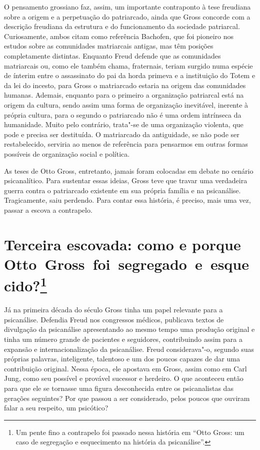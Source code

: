 O pensamento grossiano faz, assim, um importante contraponto à tese
freudiana sobre a origem e a perpetuação do patriarcado, ainda que Gross
concorde com a descrição freudiana da estrutura e do funcionamento da
sociedade patriarcal. Curiosamente, ambos citam como referência
Bachofen, que foi pioneiro nos estudos sobre as comunidades matriarcais
antigas, mas têm posições completamente distintas. Enquanto Freud
defende que as comunidades matriarcais ou, como ele também chama,
fraternais, teriam surgido numa espécie de ínterim entre o assassinato
do pai da horda primeva e a instituição do Totem e da lei do incesto,
para Gross o matriarcado estaria na origem das comunidades humanas.
Ademais, enquanto para o primeiro a organização patriarcal está na
origem da cultura, sendo assim uma forma de organização inevitável,
inerente à própria cultura, para o segundo o patriarcado não é uma ordem
intrínseca da humanidade. Muito pelo contrário, trata"-se de uma
organização violenta, que pode e precisa ser destituída. O matriarcado
da antiguidade, se não pode ser restabelecido, serviria ao menos de
referência para pensarmos em outras formas possíveis de organização
social e política.

As teses de Otto Gross, entretanto, jamais foram colocadas em debate no
cenário psicanalítico. Para sustentar essas ideias, Gross teve que
travar uma verdadeira guerra contra o patriarcado existente em sua
própria família e na psicanálise. Tragicamente, saiu perdendo. Para
contar essa história, é preciso, mais uma vez, passar a escova a
contrapelo.

\section{Terceira escovada: como e porque Otto~Gross~foi~segregado~e~esquecido?\protect\footnote{\uppercase{U}m pente fino a contrapelo foi passado nessa
  história em ``\uppercase{O}tto \uppercase{G}ross: um caso de segregação e esquecimento na
  história da psicanálise''.}}

Já na primeira década do século  Gross tinha um papel relevante para a
psicanálise. Defendia Freud nos congressos médicos, publicava textos de
divulgação da psicanálise apresentando ao mesmo tempo uma produção
original e tinha um número grande de pacientes e seguidores,
contribuindo assim para a expansão e internacionalização da psicanálise.
Freud considerava"-o, segundo suas próprias palavras, inteligente,
talentoso e um dos poucos capazes de dar uma contribuição original.
Nessa época, ele apostava em Gross, assim como em Carl Jung, como seu
possível e provável sucessor e herdeiro. O que aconteceu então para que
ele se tornasse uma figura desconhecida entre os psicanalistas das
gerações seguintes? Por que passou a ser considerado, pelos poucos que
ouviram falar a seu respeito, um psicótico?

